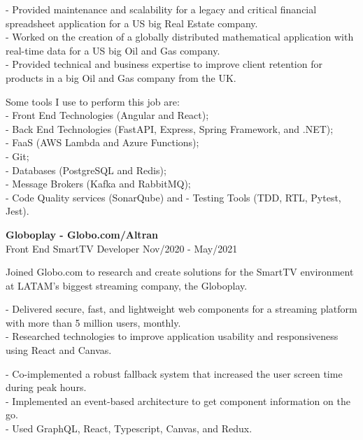 \documentclass[12pt]{article}
\newcommand{\jobentry}[3]{\textbf{#1} \\ #2 \hfill #3}
\begin{document}
\medskip

\begin{paracol}{2}

    - Provided maintenance and scalability for a legacy and critical financial spreadsheet application for a US big Real Estate company. \\

    - Worked on the creation of a globally distributed mathematical application with real-time data for a US big Oil and Gas company. \\

    - Provided technical and business expertise to improve client retention for products in a big Oil and Gas company from the UK.

    \switchcolumn

    Some tools I use to perform this job are: \\
    - Front End Technologies (Angular and React); \\
    - Back End Technologies (FastAPI, Express, Spring Framework, and .NET); \\
    - FaaS (AWS Lambda and Azure Functions); \\
    - Git; \\
    - Databases (PostgreSQL and Redis); \\
    - Message Brokers (Kafka and RabbitMQ); \\
    - Code Quality services (SonarQube) and
    - Testing Tools (TDD, RTL, Pytest, Jest).

\end{paracol}

\medskip

\jobentry{Globoplay - Globo.com/Altran}{Front End SmartTV Developer}{Nov/2020 - May/2021}

\smallskip

Joined Globo.com to research and create solutions for the SmartTV environment at LATAM's biggest streaming company, the Globoplay.\\

\begin{paracol}{2}

    - Delivered secure, fast, and lightweight web components for a streaming platform with more than 5 million users, monthly. \\
    - Researched technologies to improve application usability and responsiveness using React and Canvas.
    
    \switchcolumn
    
    - Co-implemented a robust fallback system that increased the user screen time during peak hours. \\
    - Implemented an event-based architecture to get component information on the go. \\
    - Used GraphQL, React, Typescript, Canvas, and Redux.

\end{paracol}
\end{document}
